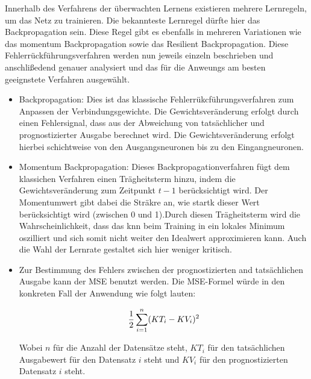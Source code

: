 Innerhalb des Verfahrens der überwachten Lernens existieren mehrere Lernregeln, um das Netz zu trainieren. Die bekannteste Lernregel dürfte hier das Backpropagation sein. Diese Regel gibt es ebenfalls in mehreren Variationen wie das momentum Backpropagation sowie das Resilient Backpropagation. Diese Fehlerrückführungsverfahren werden nun jeweils einzeln beschrieben und anschlißedend genauer analysiert und das für die Anweungs am besten geeignstete Verfahren ausgewählt.

\begin{itemize}
\item Backpropagation: Dies ist das klassische Fehlerrükcführungsverfahren zum Anpassen der Verbindungsgewichte. Die Gewichtsveränderung erfolgt durch einen Fehlersignal, dass aus der Abweichung von tatsächlicher und prognostizierter Ausgabe berechnet wird. Die Gewichtsveränderung erfolgt hierbei schichtweise von den Ausgangsneuronen bis zu den Eingangneuronen.

\item Momentum Backpropagation: Dieses Backpropagationverfahren fügt dem klassichen Verfahren einen Trägheitsterm hinzu, indem die Gewichtsveränderung zum Zeitpunkt $t-1$ berücksichtigt wird. Der Momentumwert gibt dabei die Sträkre an, wie startk dieser Wert berücksichtigt wird (zwischen 0 und 1).Durch diesen Trägheitsterm wird die Wahrscheinlichkeit, dass das \acs{knn} beim Training in ein lokales Minimum oszilliert und sich somit nicht weiter den Idealwert approximieren kann. Auch die Wahl der Lernrate gestaltet sich hier weniger kritisch. 

\item  




Zur Bestimmung des Fehlers zwischen der prognostizierten and tatsächlichen Ausgabe kann der MSE benutzt werden. Die MSE-Formel würde in den konkreten Fall der Anwendung wie folgt lauten:

\begin{equation}\formelentry{MSE zur Berechnung der Abweichung}
   \frac{1}{2}\sum^{n}_{i=1} (KT_{i} - KV_{i})^2
\end{equation}

Wobei $n$ für die Anzahl der Datensätze steht, $KT_i$ für den tatsächlichen Ausgabewert für den Datensatz $i$ steht und $KV_i$ für den prognostizierten Datensatz $i$ steht.

\end{itemize}




